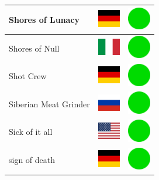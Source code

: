 \documentclass[12pt, a4paper, twoside]{report}
\begin{document}
\begin{center}
\begin{longtable}{|p{5cm}|p{2cm}|p{2cm}|}
 Shores of Lunacy                                           & \includegraphics[width=1cm]{../img/flags/de} &   \includegraphics[width=1cm]{../likes/y} \\ \hline
 Shores of Null                                             & \includegraphics[width=1cm]{../img/flags/it} &   \includegraphics[width=1cm]{../likes/y} \\ \hline
 Shot Crew                                                  & \includegraphics[width=1cm]{../img/flags/de} &   \includegraphics[width=1cm]{../likes/y} \\ \hline
 Siberian Meat Grinder                                      & \includegraphics[width=1cm]{../img/flags/ru} &   \includegraphics[width=1cm]{../likes/y} \\ \hline
 Sick of it all                                             & \includegraphics[width=1cm]{../img/flags/us} &   \includegraphics[width=1cm]{../likes/y} \\ \hline
 sign of death                                              & \includegraphics[width=1cm]{../img/flags/de} &   \includegraphics[width=1cm]{../likes/y} \\ \hline

\end{longtable}
\end{center}
\end{document}
